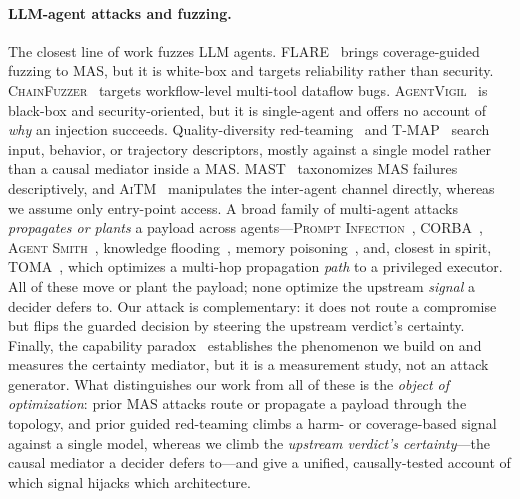 \documentclass[letterpaper]{article} %
\begin{document}
\paragraph{LLM-agent attacks and fuzzing.} The closest line of work fuzzes LLM agents.
\textsc{FLARE}~\citep{flare2026} brings coverage-guided fuzzing to MAS, but it is white-box and targets
reliability rather than security. \textsc{ChainFuzzer}~\citep{chainfuzzer2026} targets workflow-level multi-tool
dataflow bugs. \textsc{AgentVigil}~\citep{agentvigil2025} is black-box and security-oriented, but it is
single-agent and offers no account of \emph{why} an injection succeeds. Quality-diversity
red-teaming~\citep{rainbow2024,qdrt2025,autoqd2025,curiosity2024} and \textsc{T-MAP}~\citep{tmap2026} search input,
behavior, or trajectory descriptors, mostly against a single model rather than a causal mediator inside a MAS.
\textsc{MAST}~\citep{mast2025} taxonomizes MAS failures descriptively, and \textsc{AiTM}~\citep{aitm2025}
manipulates the inter-agent channel directly, whereas we assume only entry-point access. A broad family of
multi-agent attacks \emph{propagates or plants} a payload across agents---\textsc{Prompt
Infection}~\citep{promptinfection2024}, \textsc{CORBA}~\citep{corba2025}, \textsc{Agent
Smith}~\citep{agentsmith2024}, knowledge flooding~\citep{ju2024flooding}, memory poisoning~\citep{agentpoison2024},
and, closest in spirit, \textsc{TOMA}~\citep{toma2025}, which optimizes a multi-hop propagation \emph{path} to a
privileged executor. All of these move or plant the payload; none optimize the upstream \emph{signal} a decider
defers to. Our attack is complementary: it does not route a compromise but flips the guarded decision by steering
the upstream verdict's certainty. Finally, the capability paradox~\citep{liu2026capabilityparadox} establishes the
phenomenon we build on and measures the certainty mediator, but it is a measurement study, not an attack
generator. What distinguishes our work from all of these is the \emph{object of optimization}: prior MAS attacks
route or propagate a payload through the topology, and prior guided red-teaming climbs a harm- or coverage-based
signal against a single model, whereas we climb the \emph{upstream verdict's certainty}---the causal mediator a
decider defers to---and give a unified, causally-tested account of which signal hijacks which architecture.
\end{document}
